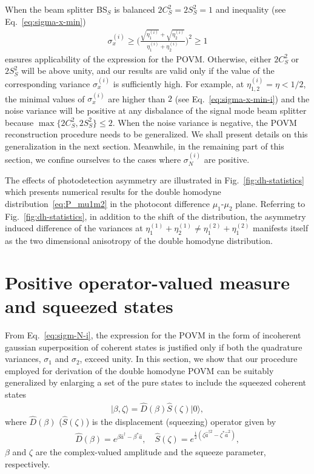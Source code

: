 \documentclass[%
reprint,
superscriptaddress,
 amsmath,amssymb,amsfonts,
 aps,
 pra,
 longbibliography
]{revtex4-2}
\newcommand{\ket}[1]{\ensuremath{|{#1}\rangle}}
\newcommand{\hcnj}[1]{{#1}^{\dagger}}
\begin{document}
When the beam splitter BS$_S$
is balanced $2 C_S^2=2 S_S^2=1$
and inequality (see Eq.~\eqref{eq:sigma-x-min})
\begin{align}
  \label{eq:sigma-x-min-i}
  \sigma_x^{(i)}\ge \Biggl(
\frac{\sqrt{\eta_1^{(i)}}+\sqrt{\eta_2^{(i)}}}{\eta_1^{(i)}+\eta_2^{(i)}}
  \Biggr)^2\ge 1
\end{align}
ensures applicability of the expression for the POVM.
Otherwise, either $2 C_S^2$ or $2 S_S^2$ will be above unity,
and our results are valid only if
the value of the corresponding variance $\sigma_x^{(i)}$ is sufficiently high.
For example, at $\eta_{1,2}^{(i)}=\eta<1/2$,
the minimal values of $\sigma_x^{(i)}$ are higher than $2$
(see Eq.~\eqref{eq:sigma-x-min-i})
and the noise variance will be positive at
any disbalance of the signal mode beam splitter
because $\max\{2 C_S^2,2 S_S^2\}\le 2$.
When the noise variance is negative,
the POVM reconstruction procedure
needs to be generalized.
We shall present details on this generalization
in the next section.
Meanwhile,
in the remaining part of this section,
we confine ourselves to the cases where $\sigma_N^{(i)}$ are positive.

The effects of photodetection asymmetry
are illustrated in Fig.~\ref{fig:dh-statistics}
which presents numerical results for
the double homodyne distribution~\eqref{eq:P_mu1m2}
in the photocont difference $\mu_1$-$\mu_2$ plane.
Referring to Fig.~\ref{fig:dh-statistics},
in addition to the shift of the distribution,
the asymmetry induced difference of the variances
at $\eta_1^{(1)}+\eta_2^{(1)}\ne \eta_1^{(2)}+\eta_1^{(2)}$
manifests itself as the two dimensional anisotropy
of the double homodyne distribution.

\section{Positive operator-valued measure and squeezed states}
\label{sec:gen-POVM}

From Eq.~\eqref{eq:sigm-N-i},
the expression for the POVM
in the form of incoherent gaussian superposition
of coherent states is justified only if
both the quadrature variances, $\sigma_1$ and $\sigma_2$,
exceed unity.
In this section, we show that our procedure employed
for derivation of the double homodyne POVM can be
suitably generalized by enlarging a set of the pure states to include
the squeezed coherent states
\begin{align}
  \label{eq:squeezed-def}
  \ket{\beta,\zeta}=\hat{D}(\beta)\hat{S}(\zeta)\ket{0},
\end{align}
where $\hat{D}(\beta)$ ($\hat{S}(\zeta)$) is the displacement
(squeezing) operator  given by
\begin{align}
\label{eq:D-S-def}
\hat{D}(\beta) =
e^{\beta\hcnj{\hat{a}}-\beta^*\hat{a}}, \quad
    \hat{S}(\zeta)=e^{\frac{1}{2}\left(\zeta\hat{a}^{\dag2}-\zeta^*\hat{a}^2\right)},
\end{align}
$\beta$ and $\zeta$ are the complex-valued amplitude
and the squeeze parameter, respectively. 
\end{document}
